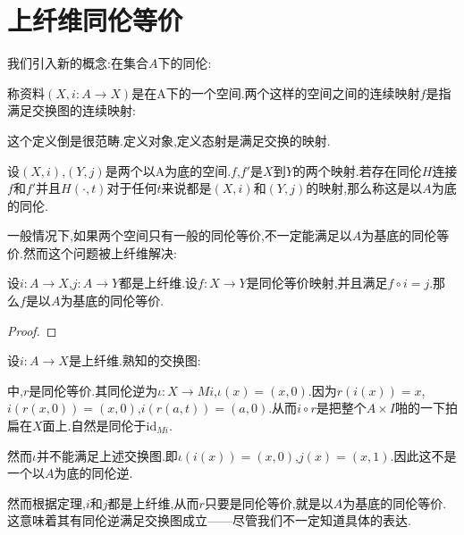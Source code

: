 \section{上纤维同伦等价}
我们引入新的概念:在集合$A$下的同伦:
\begin{definition}
    称资料$(X,i:A\to X)$是在A下的一个空间.两个这样的空间之间的连续映射$f$是指满足交换图的连续映射:
    
\end{definition}
这个定义倒是很范畴.定义对象,定义态射是满足交换的映射.
\begin{definition}
    设$(X,i)$,$(Y,j)$是两个以A为底的空间.$f$,$f'$是$X$到$Y$的两个映射.若存在同伦$H$连接$f$和$f'$并且$H(\cdot,t)$对于任何$t$来说都是$(X,i)$和$(Y,j)$的映射,那么称这是以$A$为底的同伦.
\end{definition}
一般情况下,如果两个空间只有一般的同伦等价,不一定能满足以$A$为基底的同伦等价.然而这个问题被上纤维解决:
\begin{proposition}
    设$i:A \to X$,$j:A \to Y$都是上纤维.设$f:X \to Y$是同伦等价映射,并且满足$f \circ i=j$.那么$f$是以$A$为基底的同伦等价.
\end{proposition}
\begin{proof}
    
\end{proof}
\begin{example}
设$i:A \to X$是上纤维.熟知的交换图:
中,$r$是同伦等价.其同伦逆为$\iota:X \to Mi$,$\iota(x)=(x,0)$.因为$r(i(x))=x$,$i(r(x,0))=(x,0)$,$i(r(a,t))=(a,0)$.从而$i \circ r$是把整个$A \times I$啪的一下拍扁在$X$面上.自然是同伦于$\mathrm{id}_{Mi}$.

然而$\iota$并不能满足上述交换图.即$\iota(i(x))=(x,0)$,$j(x)=(x,1)$.因此这不是一个以$A$为底的同伦逆.

然而根据定理,$i$和$j$都是上纤维,从而$r$只要是同伦等价,就是以$A$为基底的同伦等价.这意味着其有同伦逆满足交换图成立——尽管我们不一定知道具体的表达.

\end{example}
